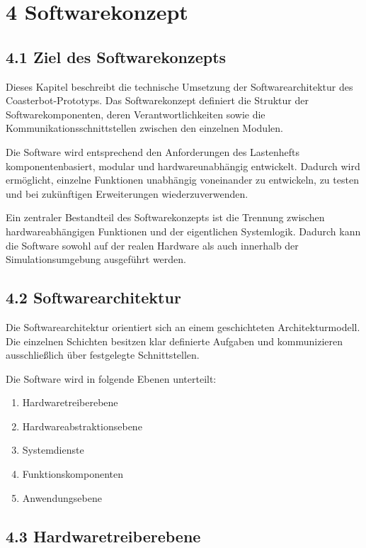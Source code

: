 \documentclass[
  a4paper,
  12pt,
  DIV=12,        %
  parskip=half,  %
  headings=small %
]{scrartcl}
\theoremstyle{definition}
\providecommand{\tightlist}{%
  \setlength{\itemsep}{0pt}\setlength{\parskip}{0pt}}
\theoremstyle{definition}
\providecommand{\tightlist}{%
  \setlength{\itemsep}{0pt}\setlength{\parskip}{0pt}}
\begin{document}
\section{4 Softwarekonzept}\label{softwarekonzept}

\subsection{4.1 Ziel des
Softwarekonzepts}\label{ziel-des-softwarekonzepts}

Dieses Kapitel beschreibt die technische Umsetzung der
Softwarearchitektur des Coasterbot-Prototyps. Das Softwarekonzept
definiert die Struktur der Softwarekomponenten, deren
Verantwortlichkeiten sowie die Kommunikationsschnittstellen zwischen den
einzelnen Modulen.

Die Software wird entsprechend den Anforderungen des Lastenhefts
komponentenbasiert, modular und hardwareunabhängig entwickelt. Dadurch
wird ermöglicht, einzelne Funktionen unabhängig voneinander zu
entwickeln, zu testen und bei zukünftigen Erweiterungen
wiederzuverwenden.

Ein zentraler Bestandteil des Softwarekonzepts ist die Trennung zwischen
hardwareabhängigen Funktionen und der eigentlichen Systemlogik. Dadurch
kann die Software sowohl auf der realen Hardware als auch innerhalb der
Simulationsumgebung ausgeführt werden.

\subsection{4.2 Softwarearchitektur}\label{softwarearchitektur}

Die Softwarearchitektur orientiert sich an einem geschichteten
Architekturmodell. Die einzelnen Schichten besitzen klar definierte
Aufgaben und kommunizieren ausschließlich über festgelegte
Schnittstellen.

Die Software wird in folgende Ebenen unterteilt:

\begin{enumerate}
\def\labelenumi{\arabic{enumi}.}
\tightlist
\item
  Hardwaretreiberebene
\item
  Hardwareabstraktionsebene
\item
  Systemdienste
\item
  Funktionskomponenten
\item
  Anwendungsebene
\end{enumerate}

\subsection{4.3 Hardwaretreiberebene}\label{hardwaretreiberebene}
\end{document}
